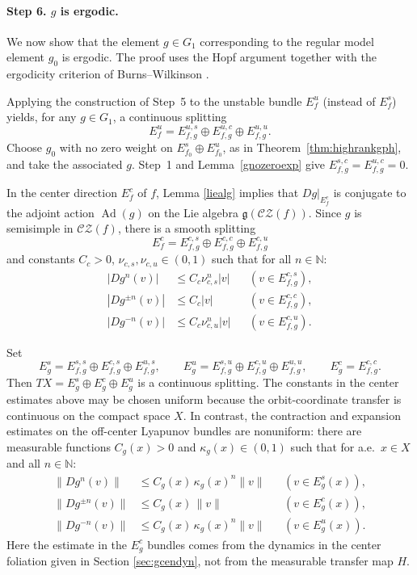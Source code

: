 \documentclass[11pt]{amsart}
\numberwithin{equation}{section}
\newcommand{\N}{\mathbb{N}}
\newcommand{\CZ}{\mathcal{CZ}}
\theoremstyle{plain}
\begin{document}
\paragraph{\textbf{Step 6. $g$ is ergodic.}}


We now show that the element $g\in G_1$ corresponding to the regular
model element $g_0$ is ergodic. The proof
uses the Hopf argument together with the ergodicity criterion of
Burns--Wilkinson \cite{BWerg}.

Applying the construction of Step~5 to the unstable bundle
$E^u_f$ (instead of $E^s_f$) yields, for any $g\in G_1$, a
continuous splitting
\[
E^u_f=E^{u,s}_{f,g}\oplus E^{u,c}_{f,g}\oplus E^{u,u}_{f,g}.
\]
Choose $g_0$ with no zero weight on
$E_{f_0}^s\oplus E_{f_0}^u$, as in
Theorem~\ref{thm:highrankgph}, and take the associated $g$.  Step~1 and
Lemma~\ref{gnozeroexp} give
$E^{s,c}_{f,g}=E^{u,c}_{f,g}=0$.

In the center direction $E^c_f$ of $f$, Lemma \ref{liealg} implies that
$Dg|_{E^c_f}$ is conjugate to the adjoint action $\operatorname{Ad}(g)$
on the Lie algebra $\mathfrak g(\CZ(f))$. Since $g$ is semisimple in
$\CZ(f)$, there is a smooth splitting
\[
E^c_f=E^{c,s}_{f,g}\oplus E^{c,c}_{f,g}\oplus E^{c,u}_{f,g}
\]
and constants $C_c>0$, $\nu_{c,s},\nu_{c,u}\in(0,1)$ such that
for all $n\in\N$:
\[
\begin{aligned}
|Dg^n(v)|&\le C_c\nu_{c,s}^n|v| &&(v\in E^{c,s}_{f,g}),\\
|Dg^{\pm n}(v)|&\le C_c|v| &&(v\in E^{c,c}_{f,g}),\\
|Dg^{-n}(v)|&\le C_c\nu_{c,u}^n|v| &&(v\in E^{c,u}_{f,g}).
\end{aligned}
\]

Set
\[
E^s_g=E^{s,s}_{f,g}\oplus E^{c,s}_{f,g}\oplus E^{u,s}_{f,g},\qquad
E^u_g=E^{s,u}_{f,g}\oplus E^{c,u}_{f,g}\oplus E^{u,u}_{f,g},\qquad
E^c_g=E^{c,c}_{f,g}.
\]
Then $TX=E^s_g\oplus E^c_g\oplus E^u_g$ is a
continuous splitting. The constants in the center estimates above may be
chosen uniform because the orbit-coordinate transfer is continuous on the
compact space $X$. In contrast, the contraction and expansion estimates on
the off-center Lyapunov bundles are nonuniform: there are measurable
functions $C_g(x)>0$ and $\kappa_g(x)\in(0,1)$ such that for a.e.\
$x\in X$ and all $n\in\N$:
\begin{equation}\label{gbund}
    \begin{aligned}
\|Dg^n(v)\|&\le C_g(x)\,\kappa_g(x)^n\|v\| &&(v\in E^s_g(x)),\\
\|Dg^{\pm n}(v)\|&\le C_g(x)\,\|v\| &&(v\in E^c_g(x)),\\
\|Dg^{-n}(v)\|&\le C_g(x)\,\kappa_g(x)^n\|v\| &&(v\in E^u_g(x)).
\end{aligned}
\end{equation} Here the estimate in the $E^c_g$ bundles comes from the dynamics in the center foliation given in Section \ref{sec:gcendyn}, not from the measurable transfer map $H$.
\end{document}
